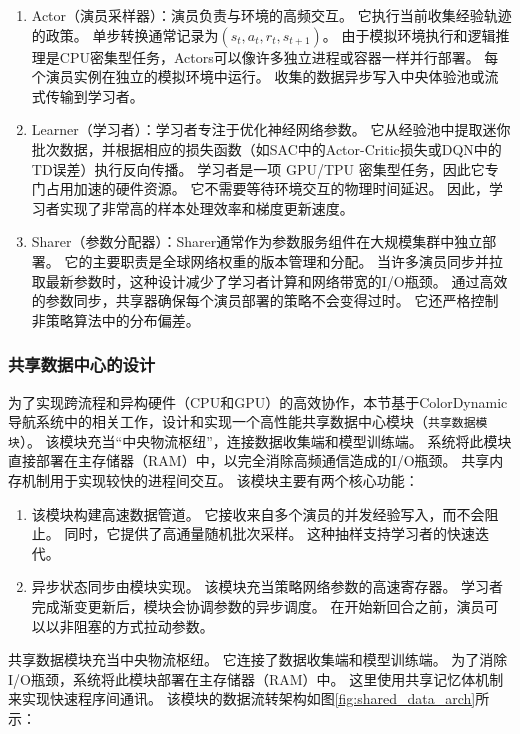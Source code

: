\begin{enumerate}
\item Actor（演员采样器）：演员负责与环境的高频交互。 它执行当前收集经验轨迹的政策。 单步转换通常记录为$(s_t, a_t, r_t, s_{t+1})$。 由于模拟环境执行和逻辑推理是CPU密集型任务，Actors可以像许多独立进程或容器一样并行部署。 每个演员实例在独立的模拟环境中运行。 收集的数据异步写入中央体验池或流式传输到学习者。

\item Learner（学习者）：学习者专注于优化神经网络参数。 它从经验池中提取迷你批次数据，并根据相应的损失函数（如SAC中的Actor-Critic损失或DQN中的TD误差）执行反向传播。 学习者是一项 GPU/TPU 密集型任务，因此它专门占用加速的硬件资源。 它不需要等待环境交互的物理时间延迟。 因此，学习者实现了非常高的样本处理效率和梯度更新速度。

\item Sharer（参数分配器）：Sharer通常作为参数服务组件在大规模集群中独立部署。 它的主要职责是全球网络权重的版本管理和分配。 当许多演员同步并拉取最新参数时，这种设计减少了学习者计算和网络带宽的I/O瓶颈。 通过高效的参数同步，共享器确保每个演员部署的策略不会变得过时。 它还严格控制非策略算法中的分布偏差。

\end{enumerate}

\subsubsection{共享数据中心的设计}
为了实现跨流程和异构硬件（CPU和GPU）的高效协作，本节基于ColorDynamic导航系统\cite{colordynamic}中的相关工作，设计和实现一个高性能共享数据中心模块（\texttt{共享数据模块}）。 该模块充当“中央物流枢纽”，连接数据收集端和模型训练端。 系统将此模块直接部署在主存储器（RAM）中，以完全消除高频通信造成的I/O瓶颈。 共享内存机制用于实现较快的进程间交互。 该模块主要有两个核心功能：
\begin{enumerate}

\item 该模块构建高速数据管道。 它接收来自多个演员的并发经验写入，而不会阻止。 同时，它提供了高通量随机批次采样。 这种抽样支持学习者的快速迭代。

\item 异步状态同步由模块实现。 该模块充当策略网络参数的高速寄存器。 学习者完成渐变更新后，模块会协调参数的异步调度。 在开始新回合之前，演员可以以非阻塞的方式拉动参数。

\end{enumerate}

共享数据模块充当中央物流枢纽。 它连接了数据收集端和模型训练端。 为了消除I/O瓶颈，系统将此模块部署在主存储器（RAM）中。 这里使用共享记忆体机制来实现快速程序间通讯。 该模块的数据流转架构如图\ref{fig:shared_data_arch}所示：

